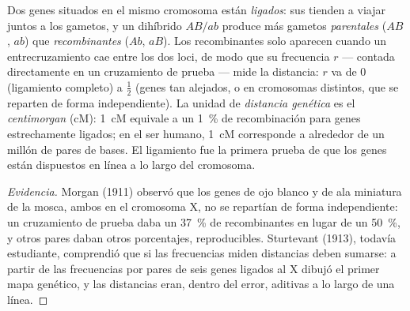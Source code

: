 \begin{definition}\label{def:b2:meiosis-heredity:linkage}
Dos genes situados en el mismo cromosoma están \emph{ligados}: sus 
tienden a viajar juntos a los gametos, y un dihíbrido
$AB/ab$ produce más gametos \emph{parentales} ($AB$, $ab$) que
\emph{recombinantes} ($Ab$, $aB$). Los recombinantes solo aparecen cuando
un entrecruzamiento cae entre los dos loci, de modo que su frecuencia
$r$ --- contada directamente en un cruzamiento de prueba --- mide la
distancia: $r$ va de 0 (ligamiento completo) a $\tfrac12$ (genes tan
alejados, o en cromosomas distintos, que se reparten de forma
independiente). La unidad de \emph{distancia genética} es el
\emph{centimorgan} (cM): \qty{1}{cM} equivale a un \qty{1}{\%} de
recombinación para genes estrechamente ligados; en el ser humano,
\qty{1}{cM} corresponde a alrededor de un millón de pares de bases. El
ligamiento fue la primera prueba de que los genes están dispuestos en
línea a lo largo del cromosoma.
\end{definition}
\begin{proof}[Evidencia]
Morgan (1911) observó que los genes de ojo blanco y de ala miniatura de la
mosca, ambos en el cromosoma X, no se repartían de forma independiente:
un cruzamiento de prueba daba un \qty{37}{\%} de recombinantes en lugar
de un \qty{50}{\%}, y otros pares daban otros porcentajes, reproducibles.
Sturtevant (1913), todavía estudiante, comprendió que si las frecuencias
miden distancias deben sumarse: a partir de las frecuencias por pares de
seis genes ligados al X dibujó el primer mapa genético, y las distancias
eran, dentro del error, aditivas a lo largo de una línea.
\end{proof}

